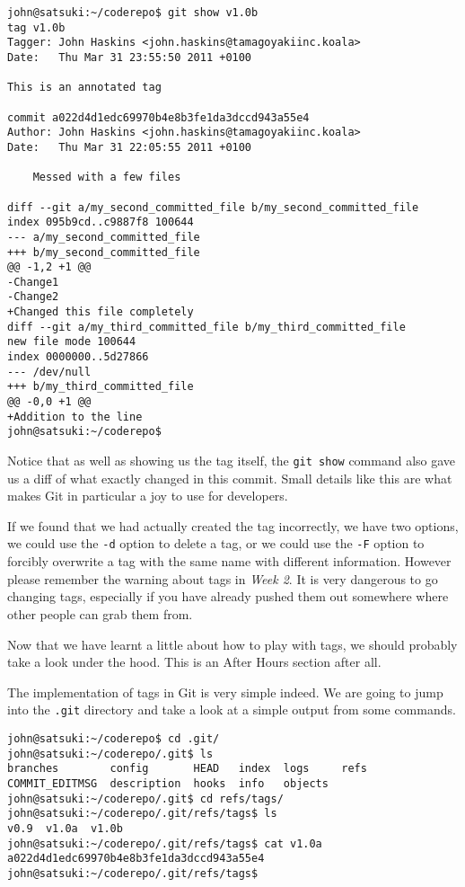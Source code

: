 \begin{Verbatim}
john@satsuki:~/coderepo$ git show v1.0b
tag v1.0b
Tagger: John Haskins <john.haskins@tamagoyakiinc.koala>
Date:   Thu Mar 31 23:55:50 2011 +0100

This is an annotated tag

commit a022d4d1edc69970b4e8b3fe1da3dccd943a55e4
Author: John Haskins <john.haskins@tamagoyakiinc.koala>
Date:   Thu Mar 31 22:05:55 2011 +0100

    Messed with a few files

diff --git a/my_second_committed_file b/my_second_committed_file
index 095b9cd..c9887f8 100644
--- a/my_second_committed_file
+++ b/my_second_committed_file
@@ -1,2 +1 @@
-Change1
-Change2
+Changed this file completely
diff --git a/my_third_committed_file b/my_third_committed_file
new file mode 100644
index 0000000..5d27866
--- /dev/null
+++ b/my_third_committed_file
@@ -0,0 +1 @@
+Addition to the line
john@satsuki:~/coderepo$ 
\end{Verbatim}

Notice that as well as showing us the tag itself, the \texttt{git show} command also gave us a diff of what exactly changed in this commit.  Small details like this are what makes Git in particular a joy to use for developers.

If we found that we had actually created the tag incorrectly, we have two options, we could use the \texttt{-d} option to delete a tag, or we could use the \texttt{-F} option to forcibly overwrite a tag with the same name with different information.  However please remember the warning about tags in \emph{Week 2}.  It is very dangerous to go changing tags, especially if you have already pushed them out somewhere where other people can grab them from.

Now that we have learnt a little about how to play with tags, we should probably take a look under the hood.  This is an After Hours section after all.

The implementation of tags in Git is very simple indeed.  We are going to jump into the \texttt{.git} directory and take a look at a simple output from some commands.

\begin{Verbatim}
john@satsuki:~/coderepo$ cd .git/
john@satsuki:~/coderepo/.git$ ls
branches        config       HEAD   index  logs     refs
COMMIT_EDITMSG  description  hooks  info   objects
john@satsuki:~/coderepo/.git$ cd refs/tags/
john@satsuki:~/coderepo/.git/refs/tags$ ls
v0.9  v1.0a  v1.0b
john@satsuki:~/coderepo/.git/refs/tags$ cat v1.0a
a022d4d1edc69970b4e8b3fe1da3dccd943a55e4
john@satsuki:~/coderepo/.git/refs/tags$ 
\end{Verbatim}

